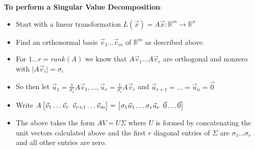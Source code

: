 \documentclass[]{scrartcl}
\begin{document}
	\textbf{To perform a Singular Value Decomposition}:
	\begin{itemize}
		\item Start with a linear transformation $L(\vec{x}) = A\vec{x}: \mathbb{R}^m \rightarrow \mathbb{R}^n$
		\item Find an orthonormal basis $\vec{v}_1 \ldots \vec{v}_m$ of $\mathbb{R}^m$ as described above.
		\item For $1 \ldots r=rank(A)$ we know that $A\vec{v}_1 \ldots A\vec{v}_r$ are orthogonal and nonzero with $\lvert A\vec{v}_i \rvert = \sigma_i$
		\item So then let $\vec{u}_1 = \frac{1}{\sigma_1}A\vec{v}_1, \ldots, \vec{u}_r = \frac{1}{\sigma_r}A\vec{v}_r$ and $\vec{u}_{r+1} = \ldots = \vec{u}_{n} = \vec{0}$
		\item Write $A \begin{bmatrix}
		\vec{v}_1 \ldots \vec{v}_r \enskip \vec{v}_{r+1} \ldots \vec{v}_m \\
		\end{bmatrix} = \begin{bmatrix}
		\sigma_1 \vec{u}_1 \ldots \sigma_r \vec{u}_r \enskip \vec{0} \ldots \vec{0}
		\end{bmatrix}$
		\item The above takes the form $AV = U\Sigma$ where $U$ is formed by concatenating the unit vectors calculated above and the first $r$ diagonal entries of $\Sigma$ are $\sigma_1 \ldots \sigma_r$ and all other entries are zero.
	\end{itemize}
	
\end{document}

